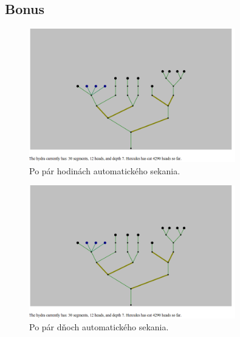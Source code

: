\documentclass[12pt,a4paper]{article}
\begin{document}
\subsection*{Bonus} 

\begin{figure}[H]
\centering
\caption{Po pár hodinách automatického sekania.} 
\includegraphics[width=0.8\textwidth]{herkules_secka.png}
\end{figure} 

\begin{figure}[H]
\centering
\caption{Po pár dňoch automatického sekania.} 
\includegraphics[width=0.8\textwidth]{herkules_secka.png}
\end{figure} 
\end{document}
